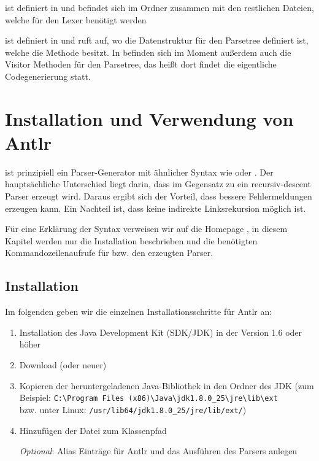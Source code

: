  ist definiert in  und befindet sich im Ordner  zusammen mit den restlichen Dateien, welche für den Lexer benötigt werden

 ist definiert in  und ruft  auf, wo die Datenstruktur für den Parsetree definiert ist, welche die Methode  besitzt. In  befinden sich im Moment außerdem auch die Visitor Methoden für den Parsetree, das heißt dort findet die eigentliche Codegenerierung statt.


\appendix
\newpage




\section{Installation und Verwendung von Antlr} 

 ist prinzipiell ein Parser-Generator mit ähnlicher Syntax wie  oder . Der hauptsächliche Unterschied liegt darin, dass im Gegensatz zu  ein recursiv-descent Parser erzeugt wird. Daraus ergibt sich der Vorteil, dass  bessere Fehlermeldungen erzeugen kann. Ein Nachteil ist, dass keine indirekte Linksrekursion möglich ist.

Für eine Erklärung der Syntax verweisen wir auf die  Homepage \cite{antlrH}, in diesem Kapitel werden nur die Installation beschrieben und die benötigten Kommandozeilenaufrufe für  bzw. den erzeugten Parser.

\subsection{Installation} \label{antlr:I}

Im folgenden geben wir die einzelnen Installationsschritte für Antlr an:

\begin{enumerate}

\item Installation des Java Development Kit (SDK/JDK) in der Version 1.6 oder höher

\item Download  (oder neuer) \cite{antlrD}



\item Kopieren der heruntergeladenen Java-Bibliothek in den  Ordner des JDK (zum Beispiel: \verb|C:\Program Files (x86)\Java\jdk1.8.0_25\jre\lib\ext| \\ bzw. unter Linux: \verb|/usr/lib64/jdk1.8.0_25/jre/lib/ext/|)


\item Hinzufügen der  Datei zum Klassenpfad 

\emph{Optional}: Alias Einträge für Antlr und das Ausführen des Parsers anlegen

\end{enumerate}

